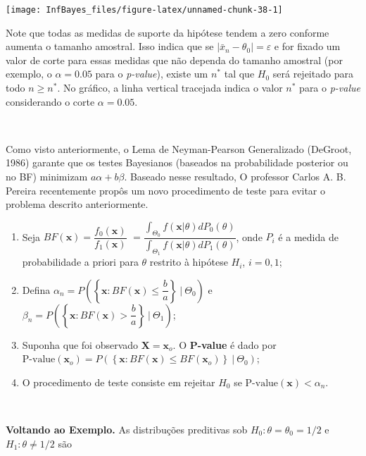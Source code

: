 \documentclass[
]{book}
\begin{document}
\begin{center}\texttt{[image: InfBayes\_files/figure-latex/unnamed-chunk-38-1]} \end{center}

Note que todas as medidas de suporte da hipótese tendem a zero conforme aumenta o tamanho amostral. Isso indica que se \(|\bar{x}_n-\theta_0|=\varepsilon\) e for fixado um valor de corte para essas medidas que não dependa do tamanho amostral (por exemplo, o \(\alpha=0.05\) para o \emph{p-value}), existe um \(n^*\) tal que \(H_0\) será rejeitado para todo \(n\geq n^*\). No gráfico, a linha vertical tracejada indica o valor \(n^*\) para o \emph{p-value} considerando o corte \(\alpha=0.05\).

\(~\)

Como visto anteriormente, o Lema de Neyman-Pearson Generalizado (DeGroot, 1986) garante que os testes Bayesianos (baseados na probabilidade posterior ou no BF) minimizam \(a\alpha + b\beta\). Baseado nesse resultado, O professor Carlos A. B. Pereira recentemente propôs um novo procedimento de teste para evitar o problema descrito anteriormente.

\begin{enumerate}
\def\labelenumi{\arabic{enumi}.}
\item
  Seja \(BF(\boldsymbol x) = \dfrac{f_0(\boldsymbol x)}{f_1(\boldsymbol x)}\)
  \(=\dfrac{\displaystyle\int_{\Theta_0} f(\boldsymbol x|\theta) dP_0(\theta)}{\displaystyle \int_{\Theta_1} f(\boldsymbol x|\theta) dP_1(\theta)}\), onde \(P_i\) é a medida de probabilidade a priori para \(\theta\) restrito à hipótese \(H_i\), \(i=0,1\);
\item
  Defina
  \(\alpha_n = P\left(\left\{\boldsymbol x : BF(\boldsymbol x)\leq\dfrac{b}{a}\right\} ~\Big|~ \Theta_0\right)\) e
  \(\beta_n = P\left(\left\{\boldsymbol x : BF(\boldsymbol x)>\dfrac{b}{a}\right\} ~\Big|~ \Theta_1\right)\);
\item
  Suponha que foi observado \(\boldsymbol X=\boldsymbol x_o\). O \textbf{P-value} é dado por
  \(\text{P-value}(\boldsymbol x_o) = P\left(\left\{\boldsymbol x : BF(\boldsymbol x)\leq BF(\boldsymbol x_o)\right\} ~\Big|~ \Theta_0\right)\);
\item
  O procedimento de teste consiste em rejeitar \(H_0\) se \(\text{P-value}(\boldsymbol x) < \alpha_n\).
\end{enumerate}

\(~\)

\textbf{Voltando ao Exemplo.} As distribuções preditivas sob \(H_0: \theta=\theta_0=1/2\) e \(H_1:\theta \neq 1/2\) são
\end{document}
